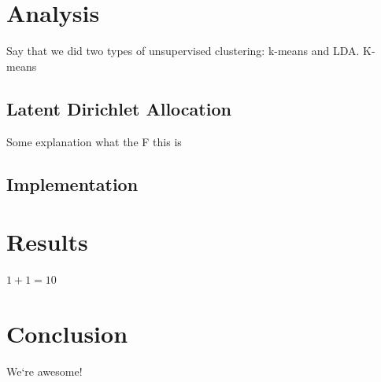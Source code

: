 \section{Analysis}
Say that we did two types of unsupervised clustering: k-means and LDA. K-means

\subsection{Latent Dirichlet Allocation}
Some explanation what the F this is

\subsection{Implementation}

\section{Results}
$1+1=10$

\section{Conclusion}
We`re awesome!
